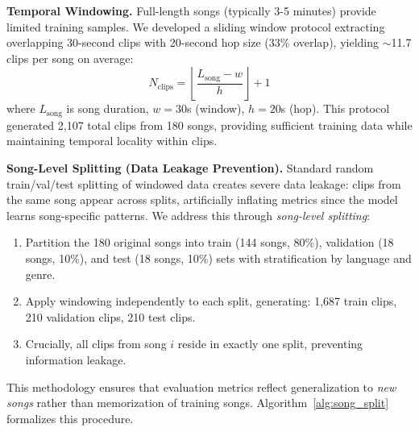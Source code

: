 \documentclass[10pt,twocolumn]{article}
\begin{document}
\textbf{Temporal Windowing.} Full-length songs (typically 3-5 minutes) provide limited training samples. We developed a sliding window protocol extracting overlapping 30-second clips with 20-second hop size (33\% overlap), yielding $\sim$11.7 clips per song on average:
\begin{equation}
N_{\text{clips}} = \left\lfloor \frac{L_{\text{song}} - w}{h} \right\rfloor + 1
\end{equation}
where $L_{\text{song}}$ is song duration, $w=30$s (window), $h=20$s (hop). This protocol generated 2,107 total clips from 180 songs, providing sufficient training data while maintaining temporal locality within clips.

\textbf{Song-Level Splitting (Data Leakage Prevention).} Standard random train/val/test splitting of windowed data creates severe data leakage: clips from the same song appear across splits, artificially inflating metrics since the model learns song-specific patterns. We address this through \emph{song-level splitting}:

\begin{enumerate}
    \item Partition the 180 original songs into train (144 songs, 80\%), validation (18 songs, 10\%), and test (18 songs, 10\%) sets with stratification by language and genre.
    \item Apply windowing independently to each split, generating: 1,687 train clips, 210 validation clips, 210 test clips.
    \item Crucially, all clips from song $i$ reside in exactly one split, preventing information leakage.
\end{enumerate}

This methodology ensures that evaluation metrics reflect generalization to \emph{new songs} rather than memorization of training songs. Algorithm~\ref{alg:song_split} formalizes this procedure.
\end{document}
